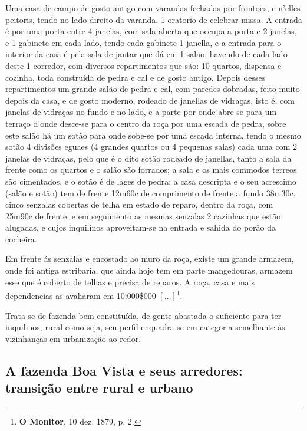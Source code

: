 \begin{citacao}
Uma casa de campo de gosto antigo com varandas fechadas por frontoes, e n'elles peitoris, tendo no lado direito da varanda, 1 oratorio de celebrar missa. A entrada é por uma porta entre 4 janelas, com sala aberta que occupa a porta e 2 janelas, e 1 gabinete em cada lado, tendo cada gabinete 1 janella, e a entrada para o interior da casa é pela sala de jantar que dá em 1 salão, havendo de cada lado deste 1 corredor, com diversos repartimentos que são: 10 quartos, dispensa e cozinha, toda construida de pedra e cal e de gosto antigo. Depois desses repartimentos um grande salão de pedra e cal, com paredes dobradas, feito muito depois da casa, e de gosto moderno, rodeado de janellas de vidraças, isto é, com janelas de vidraças no fundo e no lado, e a parte por onde abre-se para um terraço d'onde desce-se para o centro da roça por uma escada de pedra, sobre este salão há um sotão para onde sobe-se por uma escada interna, tendo o mesmo sotão 4 divisões eguaes (4 grandes quartos ou 4 pequenas salas) cada uma com 2 janelas de vidraças, pelo que é o dito sotão rodeado de janellas, tanto a sala da frente como os quartos e o salão são forrados; a sala e os mais commodos terreos são cimentados, e o sotão é de lages de pedra; a casa descripta e o seu acrescimo (salão e sotão) tem de frente 12m60c de comprimento de frente a fundo 38m30c, cinco senzalas cobertas de telha em estado de reparo, dentro da roça, com 25m90c de frente; e em seguimento as mesmas senzalas 2 cazinhas que estão alugadas, e cujos inquilinos aproveitam-se na entrada e sahida do porão da cocheira.

Em frente ás senzalas e encostado ao muro da roça, existe um grande armazem, onde foi antiga estribaria, que ainda hoje tem em parte mangedouras, armazem esse que é coberto de telhas e precisa de reparos. A roça, casa e mais dependencias as avaliaram em 10:000\$000 \([\dots]\)\footnote{\textbf{O Monitor}, 10 dez. 1879, p. 2.}.
\end{citacao}

Trata-se de fazenda bem constituída, de gente abastada o suficiente para ter inquilinos; rural como seja, seu perfil enquadra-se em categoria semelhante às vizinhanças em urbanização ao redor.

\subsection{A fazenda Boa Vista e seus arredores: transição entre rural e urbano}\label{subsec:boavista}

